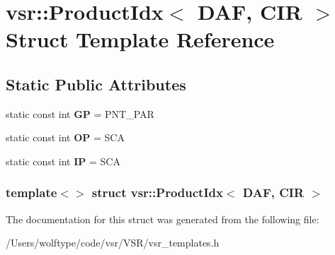\hypertarget{structvsr_1_1_product_idx_3_01_d_a_f_00_01_c_i_r_01_4}{\section{vsr\-:\-:Product\-Idx$<$ D\-A\-F, C\-I\-R $>$ Struct Template Reference}
\label{structvsr_1_1_product_idx_3_01_d_a_f_00_01_c_i_r_01_4}
}
\subsection*{Static Public Attributes}
\begin{DoxyCompactItemize}
\item 
\hypertarget{structvsr_1_1_product_idx_3_01_d_a_f_00_01_c_i_r_01_4_a4ad2867f5237ee9b30f2034c347adeeb}{static const int {\bfseries G\-P} = P\-N\-T\-\_\-\-P\-A\-R}\label{structvsr_1_1_product_idx_3_01_d_a_f_00_01_c_i_r_01_4_a4ad2867f5237ee9b30f2034c347adeeb}

\item 
\hypertarget{structvsr_1_1_product_idx_3_01_d_a_f_00_01_c_i_r_01_4_a1a9000376eabc4891113254ff9017d07}{static const int {\bfseries O\-P} = S\-C\-A}\label{structvsr_1_1_product_idx_3_01_d_a_f_00_01_c_i_r_01_4_a1a9000376eabc4891113254ff9017d07}

\item 
\hypertarget{structvsr_1_1_product_idx_3_01_d_a_f_00_01_c_i_r_01_4_ade83c07a748d297c5b89f649613af44c}{static const int {\bfseries I\-P} = S\-C\-A}\label{structvsr_1_1_product_idx_3_01_d_a_f_00_01_c_i_r_01_4_ade83c07a748d297c5b89f649613af44c}

\end{DoxyCompactItemize}
\subsubsection*{template$<$$>$ struct vsr\-::\-Product\-Idx$<$ D\-A\-F, C\-I\-R $>$}



The documentation for this struct was generated from the following file\-:\begin{DoxyCompactItemize}
\item 
/\-Users/wolftype/code/vsr/\-V\-S\-R/vsr\-\_\-templates.\-h\end{DoxyCompactItemize}

